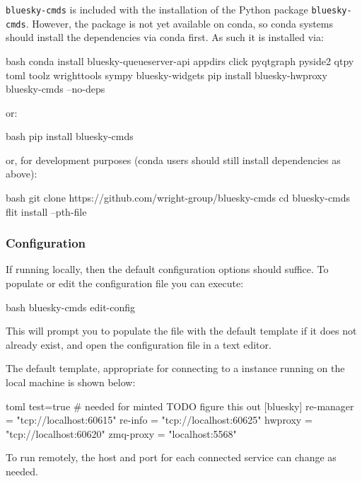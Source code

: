 \texttt{bluesky-cmds} is included with the installation of the Python package \texttt{bluesky-cmds}.
However, the package is not yet available on conda, so conda systems should install the dependencies via conda first.
As such it is installed via:

\begin{codefragment}{bash}
conda install bluesky-queueserver-api appdirs click pyqtgraph pyside2 qtpy toml toolz wrighttools sympy bluesky-widgets
pip install bluesky-hwproxy bluesky-cmds --no-deps
\end{codefragment}

or:

\begin{codefragment}{bash}
pip install bluesky-cmds
\end{codefragment}

or, for development purposes (conda users should still install dependencies as above):

\begin{codefragment}{bash}
git clone https://github.com/wright-group/bluesky-cmds
cd bluesky-cmds
flit install --pth-file
\end{codefragment}

\subsubsection{Configuration}

If running locally, then the default configuration options should suffice.
To populate or edit the configuration file you can execute:

\begin{codefragment}{bash}
bluesky-cmds edit-config
\end{codefragment}

This will prompt you to populate the file with the default template if it does not already exist, and open the configuration file in a text editor.

The default template, appropriate for connecting to a \biab instance running on the local machine is shown below:

\begin{codefragment}{toml}
test=true # needed for minted TODO figure this out
[bluesky]
re-manager = "tcp://localhost:60615"
re-info = "tcp://localhost:60625"
hwproxy = "tcp://localhost:60620"
zmq-proxy = "localhost:5568"
\end{codefragment}

To run remotely, the host and port for each connected service can change as needed.

